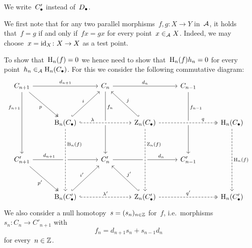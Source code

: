 \section{}

We write~$C_\bullet'$ instead of~$D_\bullet$.

We first note that for any two parallel morphisms~$f, g \colon X \to Y$ in~$\mathcal{A}$, it holds that~$f = g$ if and only if~$fx = gx$ for every point~$x \in_{\mathcal{A}} X$.
Indeed, we may choose~$x = \operatorname{id}_X \colon X \to X$ as a test point.

To show that~$\operatorname{H}_n(f) = 0$ we hence need to show that~$\operatorname{H}_n(f) h_n = 0$ for every point~$h_n \in_{\mathcal{A}} \operatorname{H}_n(C_\bullet)$.
For this we consider the following commutative diagram:
\[
  \begin{tikzcd}[row sep = huge, column sep = 2.7em]
      C_{n+1}
      \arrow{rr}[above]{d_{n+1}}
      \arrow{dd}[left, near start]{f_{n+1}}
      \arrow[two heads]{dr}[below left]{p}
    & {}
    & C_n
      \arrow{rr}[above]{d_n}
      \arrow{dd}[right, near start]{f_n}
    & {}
    & C_{n-1}
      \arrow{dd}[right, near start]{f_{n-1}}
    & {}
    \\
      {}
    & \Bl_n(\Ccc)
      \arrow[hook]{ur}[above left]{i}
    & {}
    & \Zl_n(\Ccc)
      \arrow[hook']{ul}[above right]{j}
      \arrow[hook,from=ll, dashed, crossing over, "\lambda", near start]
    & {}
    & \Hl_n(\Ccc)
      \arrow[two heads,from=ll, dashed, crossing over, "q", near end]
      \arrow[dashed]{dd}[right]{\Hl_n(f)}
    \\
      C'_{n+1}
      \arrow{rr}[above, near start]{d_{n+1}}
      \arrow[two heads]{dr}[below left]{p'}
    & {}
    & C'_n
      \arrow{rr}[above, near end]{d_n}
    & {}
    & C'_{n-1}
    & {}
    \\
      {}
    & \Bl_n(\Ccc')
      \arrow[hook]{ur}[above left]{i'}
      \arrow[hook,dashed]{rr}[above]{\lambda'}
      \arrow[from=uu, dashed, crossing over, "\Bl_n(f)", near start]
    & {}
    & \Zl_n(\Ccc')
      \arrow[hook']{ul}[above right]{j'}
      \arrow[two heads,dashed]{rr}[above]{q'}
      \arrow[from=uu, dashed, crossing over, "\Zl_n(f)", near start]
    & {}
    & \Hl_n(\Ccc')
  \end{tikzcd}
\]
We also consider a null homotopy~$s = (s_n)_{n \in \mathbb{Z}}$ for~$f$, i.e.\ morphisms~$s_n \colon C_n \to C'_{n+1}$ with
\[
  f_n = d_{n+1} s_n + s_{n-1} d_n
\]
for every~$n \in \mathbb{Z}$.

